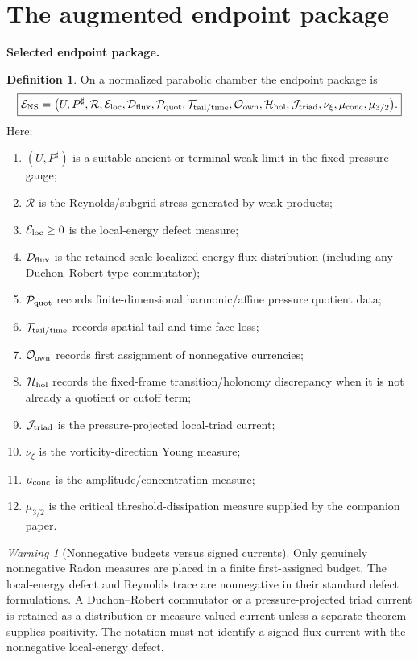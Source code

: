 \documentclass[11pt]{article}
\theoremstyle{definition}\newtheorem{problem}[theorem]{Problem}
\theoremstyle{definition}
\newtheorem{definition}[theorem]{Definition}
\theoremstyle{remark}
\newtheorem{warning}[theorem]{Warning}
\begin{document}
\section{The augmented endpoint package}

\medskip
\noindent\textbf{Selected endpoint package.}
\begin{definition}
On a normalized parabolic chamber the endpoint package is
\[
\boxed{
\mathcal E_{\rm NS}
=
\bigl(
 U,P^\sharp,\mathcal R,\mathcal E_{\rm loc},
 \mathcal D_{\rm flux},\mathcal P_{\rm quot},
 \mathcal T_{\rm tail/time},\mathcal O_{\rm own},
 \mathcal H_{\rm hol},\mathcal J_{\rm triad},
 \nu_\xi,\mu_{\rm conc},\mu_{3/2}
\bigr).
}
\]
Here:
\begin{enumerate}[label=(\roman*),leftmargin=*]
\item \((U,P^\sharp)\) is a suitable ancient or terminal weak limit in the fixed
      pressure gauge;
\item \(\mathcal R\) is the Reynolds/subgrid stress generated by weak products;
\item \(\mathcal E_{\rm loc}\ge0\) is the local-energy defect measure;
\item \(\mathcal D_{\rm flux}\) is the retained scale-localized energy-flux
      distribution (including any Duchon--Robert type commutator);
\item \(\mathcal P_{\rm quot}\) records finite-dimensional harmonic/affine
      pressure quotient data;
\item \(\mathcal T_{\rm tail/time}\) records spatial-tail and time-face loss;
\item \(\mathcal O_{\rm own}\) records first assignment of nonnegative currencies;
\item \(\mathcal H_{\rm hol}\) records the fixed-frame transition/holonomy
      discrepancy when it is not already a quotient or cutoff term;
\item \(\mathcal J_{\rm triad}\) is the pressure-projected local-triad current;
\item \(\nu_\xi\) is the vorticity-direction Young measure;
\item \(\mu_{\rm conc}\) is the amplitude/concentration measure;
\item \(\mu_{3/2}\) is the critical threshold-dissipation measure supplied by
      the companion paper.
\end{enumerate}
\end{definition}

\begin{warning}[Nonnegative budgets versus signed currents]
Only genuinely nonnegative Radon measures are placed in a finite first-assigned
budget.  The local-energy defect and Reynolds trace are nonnegative in their
standard defect formulations.  A Duchon--Robert commutator or a
pressure-projected triad current is retained as a distribution or
measure-valued current unless a separate theorem supplies positivity.  The
notation must not identify a signed flux current with the nonnegative
local-energy defect.
\end{warning}
\end{document}
